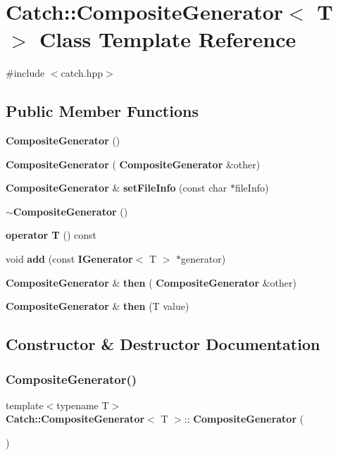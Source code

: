 \section{Catch\+:\+:Composite\+Generator$<$ T $>$ Class Template Reference}
\label{class_catch_1_1_composite_generator}


{\ttfamily \#include $<$catch.\+hpp$>$}

\subsection*{Public Member Functions}
\begin{DoxyCompactItemize}
\item 
\textbf{ Composite\+Generator} ()
\item 
\textbf{ Composite\+Generator} (\textbf{ Composite\+Generator} \&other)
\item 
\textbf{ Composite\+Generator} \& \textbf{ set\+File\+Info} (const char $\ast$file\+Info)
\item 
\textbf{ $\sim$\+Composite\+Generator} ()
\item 
\textbf{ operator T} () const
\item 
void \textbf{ add} (const \textbf{ I\+Generator}$<$ T $>$ $\ast$generator)
\item 
\textbf{ Composite\+Generator} \& \textbf{ then} (\textbf{ Composite\+Generator} \&other)
\item 
\textbf{ Composite\+Generator} \& \textbf{ then} (T value)
\end{DoxyCompactItemize}


\subsection{Constructor \& Destructor Documentation}
\mbox{\label{class_catch_1_1_composite_generator_a923398b140371d1783858766864a1af5}} 
\subsubsection{Composite\+Generator()\hspace{0.1cm}{\footnotesize\ttfamily [1/2]}}
{\footnotesize\ttfamily template$<$typename T$>$ \\
\textbf{ Catch\+::\+Composite\+Generator}$<$ T $>$\+::\textbf{ Composite\+Generator} (\begin{DoxyParamCaption}{ }\end{DoxyParamCaption})\hspace{0.3cm}{\ttfamily [inline]}}

